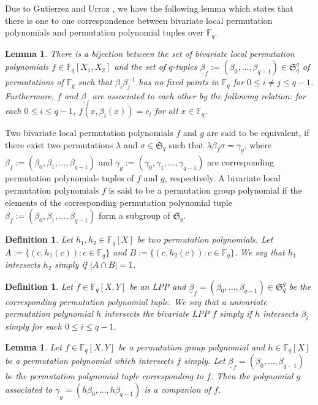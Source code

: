 \documentclass[11pt]{amsart}
\theoremstyle{plain}
\newtheorem{lem}[thm]{Lemma}
\numberwithin{equation}{section}
\newtheorem{defn}[thm]{Definition}
\def\F{{\mathbb F}}
\begin{document}
Due to Gutierrez and Urroz \cite{JJ_2023}, we have the following lemma which states that there is one to one correspondence between bivariate local permutation polynomials and permutation polynomial tuples over $\F_q$. 
\begin{lem}{\upshape\cite[Lemma 7]{JJ_2023}}
\label{tpl}
There is a bijection between the set of bivariate local permutation polynomials $f\in \F_q[X_1,X_2]$ and the set of $q$-tuples $\underline{\beta}_f :=(\beta_0,\ldots,\beta_{q-1}) \in {\mathfrak S}_q^q$ of permutations of $\mathbb F_q$ such that $\beta_i \beta_j^{-1}$ has no fixed points in $\F_q$ for $0 \leq i \neq j \leq q-1$. Furthermore, $f$ and $\underline{\beta}_f$ are associated to each other by the following relation: for each $0 \leq i \leq q-1$, $f(x,\beta_i(x))=c_i$ for all $x\in \F_q$.
\end{lem} 
Two bivariate local permutation polynomials $f$ and $g$ are said to be equivalent, if there exist two permutations $\lambda$ and $\sigma \in \mathfrak{S}_q$ such that $\lambda \beta_{\underline{f}}\sigma= \gamma_{\underline{g}}$, where $\beta_{\underline{f}}:=(\beta_0,\beta_1,\ldots,\beta_{q-1})$ and $\gamma_{\underline{g}}:=(\gamma_0,\gamma_1,\ldots,\gamma_{q-1})$ are corresponding permutation polynomials tuples of $f$ and $g$, respectively. A bivariate local permutation polynomials $f$ is said to be a permutation group polynomial if the elements of the corresponding permutation polynomial tuple $\beta_{\underline{f}}:=(\beta_0,\beta_1,\ldots,\beta_{q-1})$ form a subgroup of $\mathfrak{S}_q$. 
\begin{defn}\label{D21}{\upshape \cite[Definition 4.1]{HK}}
 Let $h_1,h_2\in\F_q[X]$ be two permutation polynomials. Let $A :=\{(c,h_1(c)):c \in \F_q\}$ and $B:=\{ (c,h_2(c)):c \in \F_q\}$. We say that $h_1$ intersects $h_2$ simply  if $|A \cap B|=1$. 
 \end{defn}
 
 \begin{defn}\label{D22}{\upshape\cite[Definition 4.2]{HK}}
Let $f\in\F_q[X,Y]$ be an LPP and $\underline{\beta}_f=(\beta_0,\ldots,\beta_{q-1}) \in {\mathfrak S}_q^q$ be the corresponding permutation polynomial tuple. We say that a univariate permutation polynomial $h$ intersects the bivariate LPP $f$ simply if $h$ intersects $\beta_i$ simply for each $0 \leq i \leq q-1$. 
 \end{defn}
 
 \begin{lem}\label{L21}{\upshape\cite[Lemma 4.4]{HK}}
Let $f\in \F_q[X,Y]$ be a permutation group polynomial and $h\in\F_q[X]$ be a permutation polynomial which intersects $f$ simply. Let $\underline{\beta}_f=(\beta_0,\ldots,\beta_{q-1})$ be the permutation polynomial tuple corresponding  to $f$. Then the polynomial $g$ associated  to $\underline{\gamma}_g=(h \beta_0, \ldots,h \beta_{q-1})$ is a companion of $f$.
\end{lem}
\end{document}

